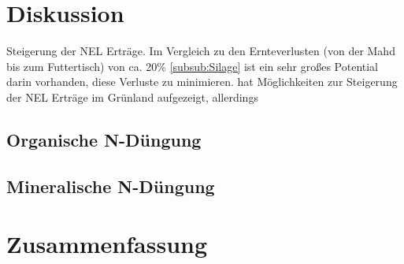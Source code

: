 \documentclass[12pt,titlepage]{scrartcl}
\begin{document}
\section{Diskussion}
\label{sec:Disukussion}
Steigerung der \ac{NEL} Erträge.
Im Vergleich zu den Ernteverlusten (von der Mahd bis zum Futtertisch) von ca. 20\% \cref{subsub:Silage} ist ein sehr großes Potential darin vorhanden, diese Verluste zu minimieren.
\textcite[33-36]{weggler2050leguminosen} hat Möglichkeiten zur Steigerung der \ac{NEL} Erträge im Grünland aufgezeigt, allerdings

\subsection{Organische N-Düngung}
\label{subsec:Dis:orgN}

\subsection{Mineralische N-Düngung}
\label{subsec:Dis:minN}

\section{Zusammenfassung}
\label{sec:Zusammenfassung}


\begin{singlespace} %
\begin{flushleft} %
\printbibliography[title=Literaturverzeichnis]
\end{flushleft}
\end{singlespace}

\end{document}
